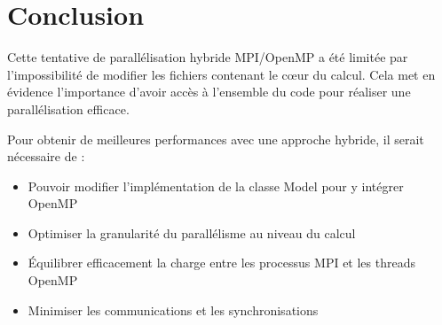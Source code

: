 \documentclass[11pt]{article}
\begin{document}
\section{Conclusion}
Cette tentative de parallélisation hybride MPI/OpenMP a été limitée par l'impossibilité de modifier les fichiers contenant le cœur du calcul. Cela met en évidence l'importance d'avoir accès à l'ensemble du code pour réaliser une parallélisation efficace.

Pour obtenir de meilleures performances avec une approche hybride, il serait nécessaire de :
\begin{itemize}
    \item Pouvoir modifier l'implémentation de la classe Model pour y intégrer OpenMP
    \item Optimiser la granularité du parallélisme au niveau du calcul
    \item Équilibrer efficacement la charge entre les processus MPI et les threads OpenMP
    \item Minimiser les communications et les synchronisations
\end{itemize}
\end{document}
